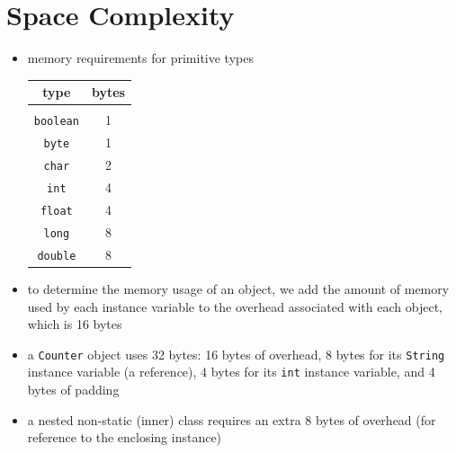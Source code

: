 \documentclass[8pt,a4paper,compress]{beamer}
\begin{document}
\section{Space Complexity}
\begin{frame}[fragile]
\begin{itemize}
\item memory requirements for primitive types
\begin{center}
\begin{tabular}{cc}
\textbf{type} & \textbf{bytes} \\ \hline \\
\lstinline$boolean$ & 1 \\
\lstinline$byte$ & 1 \\
\lstinline$char$ & 2 \\
\lstinline$int$ & 4 \\
\lstinline$float$ & 4 \\
\lstinline$long$ & 8 \\
\lstinline$double$ & 8
\end{tabular} 
\end{center}

\item to determine the memory usage of an object, we add the amount of memory used by each instance variable to the overhead associated with each object, which is 16 bytes

\item a \lstinline{Counter} object uses 32 bytes: 16 bytes of overhead, 8 bytes for its \lstinline{String} instance variable (a reference), 4 bytes for its \lstinline{int} instance variable, and 4 bytes of padding

\item a nested non-static (inner) class requires an extra 8 bytes of overhead (for reference to the enclosing instance)
\end{itemize}
\end{frame}
\end{document}

